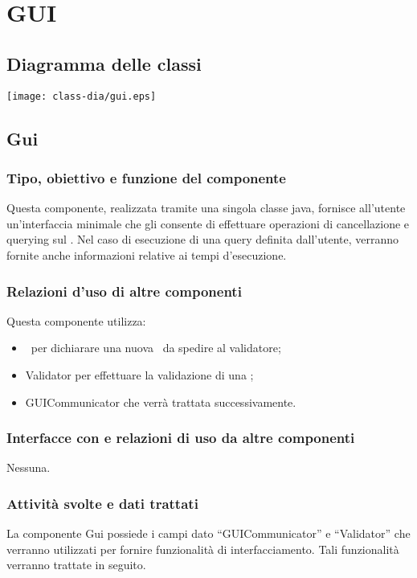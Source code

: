 \section{GUI}
\subsection{Diagramma delle classi}
\begin{center}
\texttt{[image: class-dia/gui.eps]}
\end{center}
\subsection{Gui}
\subsubsection{Tipo, obiettivo e funzione del componente}
Questa componente, realizzata tramite una singola classe java, fornisce all'utente un'interfaccia minimale che gli consente di effettuare operazioni di cancellazione e querying sul \rp. Nel caso di esecuzione di una query definita dall'utente, verranno fornite anche informazioni relative ai tempi d'esecuzione.
\subsubsection{Relazioni d'uso di altre componenti}
Questa componente utilizza:
\begin{itemize}
 \item \BR\ per dichiarare una nuova \br\ da spedire al validatore;
 \item Validator per effettuare la validazione di una \br;
 \item GUICommunicator che verr\`a trattata successivamente.
\end{itemize}
\subsubsection{Interfacce con e relazioni di uso da altre componenti}
Nessuna.
\subsubsection{Attivit\`a svolte e dati trattati}
La componente Gui possiede i campi dato ``GUICommunicator'' e ``Validator'' che verranno utilizzati per fornire funzionalit\`a di interfacciamento. Tali funzionalit\`a verranno trattate in seguito.

